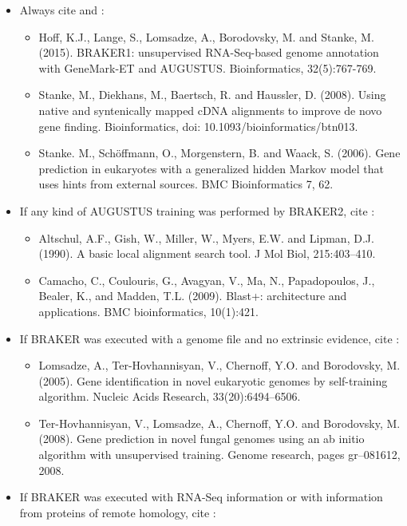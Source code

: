 \documentclass[]{article}
\begin{document}
\begin{itemize}
\item
  Always cite and :

  \begin{itemize}
  \item
    Hoff, K.J., Lange, S., Lomsadze, A., Borodovsky, M. and Stanke, M.
    (2015). BRAKER1: unsupervised RNA-Seq-based genome annotation with
    GeneMark-ET and AUGUSTUS. Bioinformatics, 32(5):767-769.
  \item
    Stanke, M., Diekhans, M., Baertsch, R. and Haussler, D. (2008).
    Using native and syntenically mapped cDNA alignments to improve de
    novo gene finding. Bioinformatics, doi:
    10.1093/bioinformatics/btn013.
  \item
    Stanke. M., Schöffmann, O., Morgenstern, B. and Waack, S. (2006).
    Gene prediction in eukaryotes with a generalized hidden Markov model
    that uses hints from external sources. BMC Bioinformatics 7, 62.
  \end{itemize}
\item
  If any kind of AUGUSTUS training was performed by BRAKER2, cite :

  \begin{itemize}
  \item
    Altschul, A.F., Gish, W., Miller, W., Myers, E.W. and Lipman, D.J.
    (1990). A basic local alignment search tool. J Mol Biol,
    215:403--410.
  \item
    Camacho, C., Coulouris, G., Avagyan, V., Ma, N., Papadopoulos, J.,
    Bealer, K., and Madden, T.L. (2009). Blast+: architecture and
    applications. BMC bioinformatics, 10(1):421.
  \end{itemize}
\item
  If BRAKER was executed with a genome file and no extrinsic evidence,
  cite :

  \begin{itemize}
  \item
    Lomsadze, A., Ter-Hovhannisyan, V., Chernoff, Y.O. and Borodovsky,
    M. (2005). Gene identification in novel eukaryotic genomes by
    self-training algorithm. Nucleic Acids Research, 33(20):6494--6506.
  \item
    Ter-Hovhannisyan, V., Lomsadze, A., Chernoff, Y.O. and Borodovsky,
    M. (2008). Gene prediction in novel fungal genomes using an ab
    initio algorithm with unsupervised training. Genome research, pages
    gr--081612, 2008.
  \end{itemize}
\item
  If BRAKER was executed with RNA-Seq information or with information
  from proteins of remote homology, cite :


\end{itemize}
\end{document}
